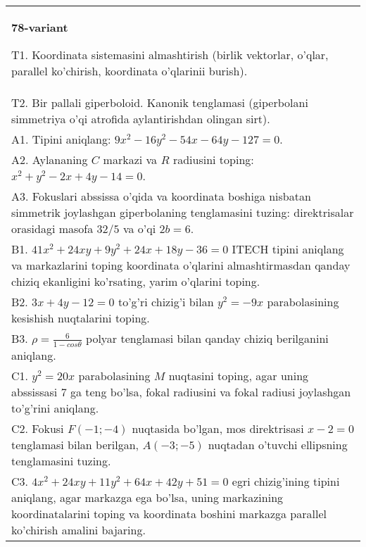 \documentclass{article}
\begin{document}
\begin{tabular}{m{17cm}}
\textbf{78-variant}
\newline

T1. Koordinata sistemasini almashtirish (birlik vektorlar, o'qlar, parallel ko'chirish, koordinata o'qlarinii burish).\\

T2. Bir pallali giperboloid. Kanonik tenglamasi (giperbolani simmetriya o'qi atrofida aylantirishdan olingan sirt).\\

A1. Tipini aniqlang: $9x^{2}-16y^{2}-54x-64y-127=0$.\\

A2. Aylananing $C$ markazi va $R$ radiusini toping: $x^2+y^2-2x+4y-14=0$.\\

A3. Fokuslari abssissa o'qida va koordinata boshiga nisbatan simmetrik joylashgan giperbolaning tenglamasini tuzing: direktrisalar orasidagi masofa $32/5$ va o'qi $2b=6$.\\

B1. $41x^{2} + 24xy + 9y^{2} + 24x + 18y - 36 = 0$ ITECH tipini aniqlang va markazlarini toping koordinata o'qlarini almashtirmasdan qanday chiziq ekanligini ko'rsating, yarim o'qlarini toping.  \\

B2. $3x + 4y - 12 = 0$ to'g'ri chizig'i bilan $y^{2} = - 9x$ parabolasining kesishish nuqtalarini toping.  \\

B3. $\rho = \frac{6}{1 - cos\theta}$ polyar tenglamasi bilan qanday chiziq berilganini aniqlang.  \\

C1. $y^{2} = 20x$ parabolasining $M$ nuqtasini toping, agar uning abssissasi 7 ga teng bo'lsa, fokal radiusini va fokal radiusi joylashgan to'g'rini aniqlang.\\

C2. Fokusi $F( - 1; - 4)$ nuqtasida bo'lgan, mos direktrisasi $x - 2 = 0$ tenglamasi bilan berilgan, $A( - 3; - 5)$ nuqtadan o'tuvchi ellipsning tenglamasini tuzing.  \\

C3. $4x^{2} + 24xy + 11y^{2} + 64x + 42y + 51 = 0$ egri chizig'ining tipini aniqlang, agar markazga ega bo'lsa, uning markazining koordinatalarini toping va koordinata boshini markazga parallel ko'chirish amalini bajaring.\\

\end{tabular}
\vspace{1cm}
\end{document}
